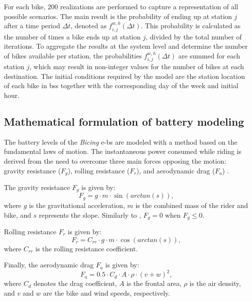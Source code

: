     For each bike, 200 realizations are performed to capture a representation of all possible scenarios. The main result is the probability of ending up at station $j$ after a time period $\Delta t$, denoted as $f^{w,h}_{i,j}(\Delta t)$. This probability is calculated as the number of times a bike ends up at station $j$, divided by the total number of iterations. To aggregate the results at the system level and determine the number of bikes available per station, the probabilities $f^{w,h}_{i,j}(\Delta t)$ are summed for each station $j$, which may result in non-integer values for the number of bikes at each destination. The initial conditions required by the model are the station location of each bike in \ac{bss} together with the corresponding day of the week and initial hour.



    \subsection{Mathematical formulation of battery modeling}
    \label{sec:battery_modeling}

      The battery levels of the \textit{Bicing} \acp{e-b} are modeled with a method based on the fundamental laws of motion. The instantaneous power consumed while riding is derived from the need to overcome three main forces opposing the motion: gravity resistance ($F_g$), rolling resistance ($F_r$), and aerodynamic drag ($F_a$) \cite{Burani2022, Steyn2014}.

      The gravity resistance $F_g$ is given by:
      \begin{equation}
      F_g=g \cdot m \cdot \sin(arctan(s)),
      \end{equation}
      where $g$ is the gravitational acceleration, $m$ is the combined mass of the rider and bike, and $s$ represents the slope. Similarly to \cite{Burani2022}, $F_g=0$ when $F_g\leq 0$.

      Rolling resistance $F_r$ is given by:
      \begin{equation}
      F_r={C_{rr}} \cdot g \cdot m  \cdot \cos(arctan(s)),
      \end{equation}
      where $C_{rr}$ is the rolling resistance coefficient.

      Finally, the aerodynamic drag $F_a$ is given by:
      \begin{equation}
      F_a=0.5 \cdot C_d \cdot A \cdot \rho \cdot (v+w)^{2},
      \end{equation}
      where $C_d$ denotes the drag coefficient, $A$ is the frontal area, $\rho$ is the air density, and $v$ and $w$ are the bike and wind speeds, respectively. 


